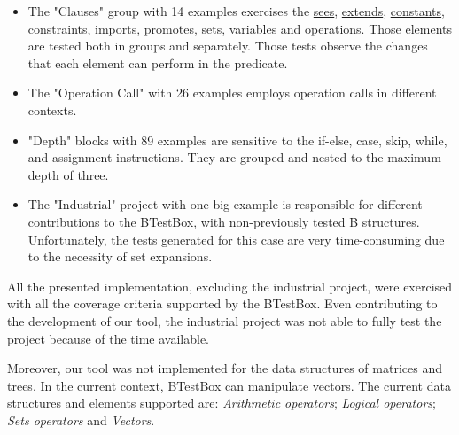 \documentclass[runningheads]{llncs}
\begin{document}
\begin{itemize}
    \item The "Clauses" group with 14 examples exercises the \underline{sees}, \underline{extends}, \underline{constants}, \underline{constraints}, \underline{imports}, \underline{promotes}, \underline{sets}, \underline{variables} and \underline{operations}. Those elements are tested both in groups and separately. Those tests observe the changes that each element can perform in the predicate.
    \item The "Operation Call" with 26 examples employs operation calls in different contexts.
    \item "Depth" blocks with 89 examples are sensitive to the if-else, case, skip, while, and assignment instructions. They are grouped and nested to the maximum depth of three.
    \item The "Industrial" project with one big example is responsible for different contributions to the BTestBox, with non-previously tested B structures. Unfortunately, the tests generated for this case are very time-consuming due to the necessity of set expansions.
\end{itemize}

All the presented implementation, excluding the industrial project, were exercised with all the coverage criteria supported by the BTestBox. Even contributing to the development of our tool, the industrial project was not able to fully test the project because of the time available.

Moreover, our tool was not implemented for the data structures of matrices and trees. In the current context, BTestBox can manipulate vectors. %
The current data structures and elements supported are: \textit{Arithmetic operators}; \textit{Logical operators};  \textit{Sets operators} and \textit{Vectors}.
\end{document}

